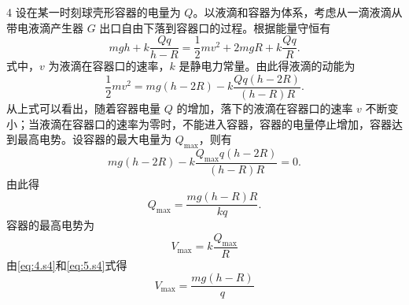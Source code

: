 \begin{solution}{4}
设在某一时刻球壳形容器的电量为 $Q$。以液滴和容器为体系，考虑从一滴液滴从带电液滴产生器 $G$ 出口自由下落到容器口的过程。根据能量守恒有
\begin{equation}
m g h + k \frac{Qq}{h-R} = \frac{1}{2} m v^{2} + 2 m g R + k \frac{Qq}{R}.
\label{eq:1.s4}
\end{equation}
式中，$v$ 为液滴在容器口的速率，$k$ 是静电力常量。由此得液滴的动能为
\begin{equation}
\frac{1}{2} m v^{2} = m g (h-2R) - k \frac{Qq(h-2R)}{(h-R)R}.
\label{eq:2.s4}
\end{equation}
从上式可以看出，随着容器电量 $Q$ 的增加，落下的液滴在容器口的速率 $v$ 不断变小；当液滴在容器口的速率为零时，不能进入容器，容器的电量停止增加，容器达到最高电势。设容器的最大电量为 $Q_{\max}$，则有
\begin{equation}
m g (h-2R) - k \frac{Q_{\max} q (h-2R)}{(h-R)R} = 0.
\label{eq:3.s4}
\end{equation}
由此得
\begin{equation}
Q_{\max} = \frac{m g (h-R)R}{k q}.
\label{eq:4.s4}
\end{equation}
容器的最高电势为
\begin{equation}
V_{\max} = k \frac{Q_{\max}}{R}
\label{eq:5.s4}
\end{equation}
由\eqref{eq:4.s4}和\eqref{eq:5.s4}式得
\begin{equation}
V_{\max} = \frac{m g (h-R)}{q}
\label{eq:6.s4}
\end{equation}
\end{solution}